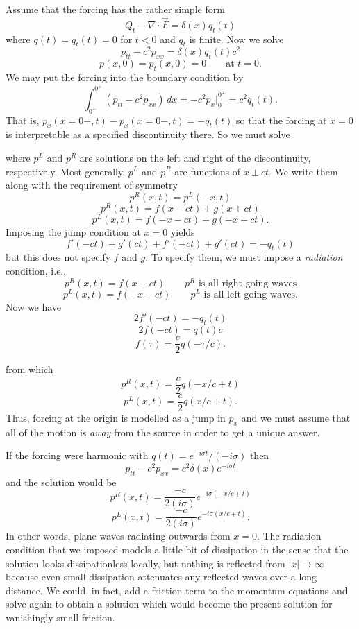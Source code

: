 Assume that the forcing has the rather simple form
\[
	Q_t-\nabla\cdot\vec F=\delta(x)q_t(t)
\]
where $q(t)=q_t(t)=0$ for $t<0$ and $q_t$ is finite. Now we solve
\[
	p_{tt}-c^2p_{xx}=\delta(x)q_t(t)c^2
\]
\[
	p(x,0)=p_t(x,0)=0\qquad\text{at }t=0.
\]
We may put the forcing into the boundary condition by
\[
	\int_{0^-}^{0^+}(p_{tt}-c^2p_{xx})\,dx
	=-c^2p_x\big|_{0^-}^{0^+}=c^2q_t(t).
\]
That is, $p_x(x=0+,t)-p_x(x=0-,t)=-q_t(t)$ so that the forcing at $x=0$ is
interpretable as a specified discontinuity there. So we must solve

\sourcepagebreak


where $p^L$ and $p^R$ are solutions on the left and right of the discontinuity, respectively.
Most generally, $p^L$ and $p^R$ are functions of $x\pm ct$. We write them along with the
requirement of symmetry
\[
	p^R(x,t)=p^L(-x,t)
\]
\[
	p^R(x,t)=f(x-ct)+g(x+ct)
\]
\[
	p^L(x,t)=f(-x-ct)+g(-x+ct).
\]
Imposing the jump condition at $x=0$ yields
\[
	f'(-ct)+g'(ct)+f'(-ct)+g'(ct)=-q_t(t)
\]
but this does not specify $f$ and $g$. To specify them, we must impose a \emph{radiation}
condition, i.e.,
\[
	p^R(x,t)=f(x-ct)\qquad p^R\text{ is all right going waves}
\]
\[
	p^L(x,t)=f(-x-ct)\qquad p^L\text{ is all left going waves}.
\]
Now we have
\[
	2f'(-ct)=-q_t(t)
\]
\[
	2f(-ct)=q(t)c
\]
\[
	f(\tau)=\frac{c}{2}q(-\tau/c).
\]

\sourcepagebreak

from which
\[
	p^R(x,t)=\frac{c}{2}q(-x/c+t)
\]
\[
	p^L(x,t)=\frac{c}{2}q(x/c+t).
\]
Thus, forcing at the origin is modelled as a jump in $p_x$ and we must assume that all of
the motion is \emph{away} from the source in order to get a unique answer.

If the forcing were harmonic with $q(t)=e^{-i\sigma t}/(-i\sigma)$ then
\[
	p_{tt}-c^2p_{xx}=c^2\delta(x)e^{-i\sigma t}
\]
and the solution would be
\[
	p^R(x,t)=\frac{-c}{2(i\sigma)}e^{-i\sigma(-x/c+t)}
\]
\[
	p^L(x,t)=\frac{-c}{2(i\sigma)}e^{-i\sigma(x/c+t)}.
\]
In other words, plane waves radiating outwards from $x=0$. The radiation condition
that we imposed models a little bit of dissipation in the sense that the solution looks
dissipationless locally, but nothing is reflected from $|x|\to\infty$ because even small
dissipation attenuates any reflected waves over a long distance. We could, in fact, add
a friction term to the momentum equations and solve again to obtain a solution which
would become the present solution for vanishingly small friction.

